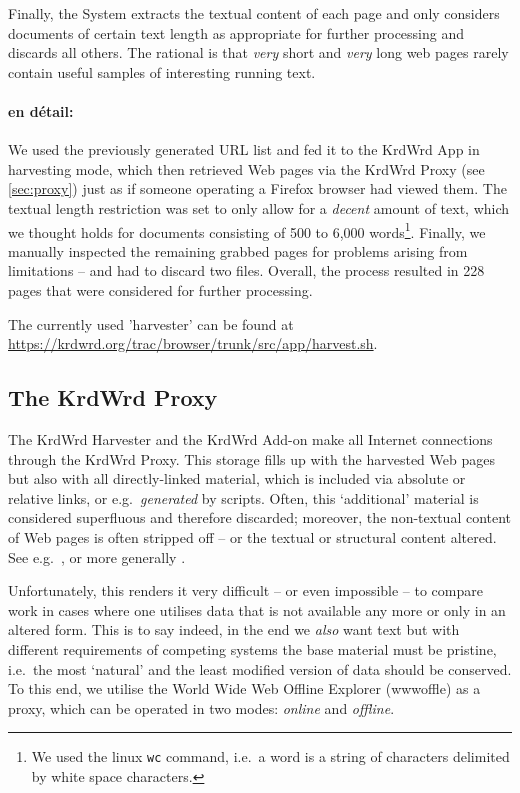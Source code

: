 \begin{longversion}
Finally, the System extracts the textual content of each page and only considers documents of certain text length as appropriate for further processing and discards all others. The rational is that \emph{very} short and \emph{very} long web pages rarely contain useful samples of interesting running text.

\paragraph{en d\'{e}tail:}
We used the previously generated URL list and fed it to the KrdWrd App in harvesting mode, which then retrieved Web pages via the KrdWrd Proxy (see \ref{sec:proxy}) just as if someone operating a Firefox browser had viewed them. 
The textual length restriction was set to only allow for a \emph{decent} amount of text, which we thought holds for documents consisting of 500 to 6,000 words\footnote{We used the linux \texttt{wc}\cite{wc} command, i.e.~a word is a string of characters delimited by white space characters.}. 
Finally, we manually inspected the remaining grabbed pages for problems arising from limitations -- and had to discard two files. 
Overall, the process resulted in 228 pages that were considered for further processing. 

\noindent \linebreak
The currently used 'harvester' can be found at \url{https://krdwrd.org/trac/browser/trunk/src/app/harvest.sh}.


\subsection{\label{sec:proxy}The KrdWrd Proxy} 

The KrdWrd Harvester and the KrdWrd Add-on make all Internet connections through the KrdWrd Proxy.
This storage fills up with the harvested Web pages but also with all directly-linked material, which is included via absolute or relative links, or e.g.~\emph{generated} by scripts.
Often, this `additional' material is considered superfluous and therefore discarded; 
moreover, the non-textual content of Web pages is often stripped off -- or the textual or structural content altered. 
See e.g.~\cite{PotaModule,cleaneval/annotation_guidelines}, or more generally \cite{WAC2,WAC3,WAC4}. 

Unfortunately, this renders it very difficult -- or even impossible -- to compare work in cases where one utilises data that is not available any more or only in an altered form.
This is to say indeed, in the end we \emph{also} want text but with different requirements of competing systems the base material must be pristine, i.e.~the most `natural' and the least modified version of data should be conserved. 
To this end, we utilise the World Wide Web Offline Explorer (wwwoffle)\cite{wwwoffle} as a proxy, which can be operated in two modes: \emph{online} and \emph{offline}. 


\end{longversion}
